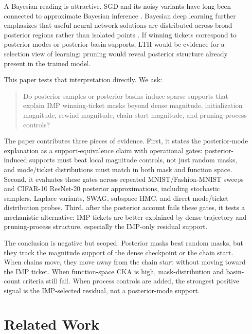 \documentclass{article}
\begin{document}
A Bayesian reading is attractive. SGD and its noisy variants have long been
connected to approximate Bayesian inference \citep{welling2011sgld,
mandt2017sgd}. Bayesian deep learning further emphasizes that useful neural
network solutions are distributed across broad posterior regions rather than
isolated points \citep{wilson2020bayesian, izmailov2021posteriors}. If winning
tickets correspond to posterior modes or posterior-basin supports, LTH would be
evidence for a selection view of learning: pruning would reveal posterior
structure already present in the trained model.

This paper tests that interpretation directly. We ask:

\begin{quote}
Do posterior samples or posterior basins induce sparse supports that explain IMP
winning-ticket masks beyond dense magnitude, initialization magnitude, rewind
magnitude, chain-start magnitude, and pruning-process controls?
\end{quote}

The paper contributes three pieces of evidence. First, it states the
posterior-mode explanation as a support-equivalence claim with operational
gates: posterior-induced supports must beat local magnitude controls, not just
random masks, and mode/ticket distributions must match in both mask and
function space. Second, it evaluates these gates across repeated
MNIST/Fashion-MNIST sweeps and CIFAR-10 ResNet-20 posterior approximations,
including stochastic samplers, Laplace variants, SWAG, subspace HMC, and direct
mode/ticket distribution probes. Third, after the posterior account fails these
gates, it tests a mechanistic alternative: IMP tickets are better explained by
dense-trajectory and pruning-process structure, especially the IMP-only
residual support.

The conclusion is negative but scoped. Posterior masks beat random masks, but
they track the magnitude support of the dense checkpoint or the chain start.
When chains move, they move away from the chain start without moving toward the
IMP ticket. When function-space CKA is high, mask-distribution and basin-count
criteria still fail. When process controls are added, the strongest positive
signal is the IMP-selected residual, not a posterior-mode support.

\section{Related Work}
\end{document}
